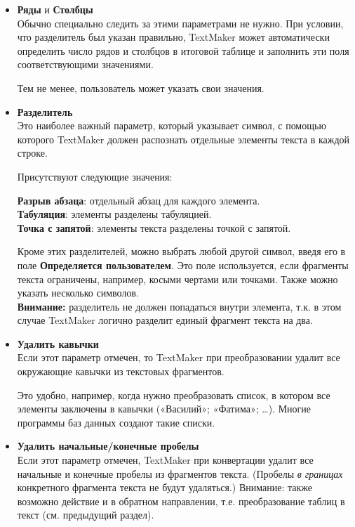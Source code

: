 ﻿\documentclass[a4paper,10pt]{article}
\begin{document}
\begin{itemize}
 \item \textbf{Ряды} и \textbf{Столбцы}\\
Обычно специально следить за этими параметрами не нужно. При условии, что разделитель был указан правильно, TextMaker может автоматически определить число рядов и столбцов в итоговой таблице и заполнить эти поля соответствующими значениями.

Тем не менее, пользователь может указать свои значения.
\item \textbf{Разделитель}\\
Это наиболее важный параметр, который указывает символ, с помощью которого TextMaker должен распознать отдельные элементы текста в каждой строке.

Присутствуют следующие значения:

\textbf{Разрыв абзаца}: отдельный абзац для каждого элемента.\\
\textbf{Табуляция}: элементы разделены табуляцией.\\
\textbf{Точка с запятой}: элементы текста разделены точкой с запятой.

Кроме этих разделителей, можно выбрать любой другой символ, введя его в поле \textbf{Определяется пользователем}. Это поле используется, если фрагменты текста ограничены, например, косыми чертами или точками. Также можно указать несколько символов.\\
\textbf{Внимание:} разделитель не должен попадаться внутри элемента, т.к. в этом случае TextMaker логично разделит единый фрагмент текста на два.
\item \textbf{Удалить кавычки}\\
Если этот параметр отмечен, то TextMaker при преобразовании удалит все окружающие кавычки из текстовых фрагментов.

Это удобно, например, когда нужно преобразовать список, в котором все элементы заключены в кавычки («Василий»; «Фатима»; …). Многие программы баз данных создают такие списки.
\item \textbf{Удалить начальные/конечные пробелы}\\
Если этот параметр отмечен, TextMaker при конвертации удалит все начальные и конечные пробелы из фрагментов текста. (Пробелы \textit{в границах} конкретного фрагмента текста не будут удаляться.)
Внимание: также возможно действие и в обратном направлении, т.е. преобразование таблиц в текст (см. предыдущий раздел).
\end{itemize}
\end{document}
